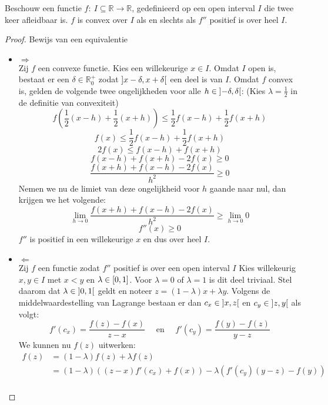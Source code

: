 \documentclass[main.tex]{subfiles}
\begin{document}
\begin{bpr}
  Beschouw een functie $f:\ I \subseteq \mathbb{R} \rightarrow \mathbb{R}$, gedefinieerd op een open interval $I$ die twee keer afleidbaar is.
  $f$ is convex over $I$ als en slechts als $f''$ positief is over heel $I$.

  \begin{proof}
    Bewijs van een equivalentie
    \begin{itemize}
    \item $\Rightarrow$\\
      Zij $f$ een convexe functie.
      Kies een willekeurige $x\in I$.
      Omdat $I$ open is, bestaat er een $\delta \in \mathbb{R}_{0}^{+}$ zodat $\interval[open]{x-\delta}{x+\delta}$ een deel is van $I$.
      Omdat $f$ convex is, gelden de volgende twee ongelijkheden voor alle $h \in \interval[open]{-\delta}{\delta}$:
      (Kies $\lambda = \frac{1}{2}$ in de definitie van convexiteit)
      \[ f\left(\frac{1}{2}(x-h) + \frac{1}{2}(x+h)\right) \le \frac{1}{2}f(x-h) + \frac{1}{2}f(x+h) \]
      \[ f(x) \le \frac{1}{2}f(x-h) + \frac{1}{2}f(x+h) \]
      \[ 2f(x) \le f(x-h) + f(x+h) \]
      \[ f(x-h) + f(x+h) -2f(x) \ge 0 \]
      \[ \frac{f(x+h)+f(x-h)-2f(x)}{h^{2}} \ge 0 \]
      Nemen we nu de limiet van deze ongelijkheid voor $h$ gaande naar nul, dan krijgen we het volgende:
      \[ \lim_{h \rightarrow 0}\frac{f(x+h)+f(x-h)-2f(x)}{h^{2}} \ge \lim_{h \rightarrow 0}0 \]
      \[ f''(x) \ge 0 \]
      $f''$ is positief in een willekeurige $x$ en dus over heel $I$.
    \item $\Leftarrow$\\
      Zij $f$ een functie zodat $f''$ positief is over een open interval $I$
      Kies willekeurig $x,y \in I$   met $x < y$ en $\lambda \in \interval{0}{1}$.
      Voor $\lambda = 0$ of $\lambda = 1$ is dit deel triviaal.
      Stel daarom dat $\lambda \in \interval[open]{0}{1}$ geldt en noteer $z = (1-\lambda)x + \lambda y$.
      Volgens de middelwaardestelling van Lagrange bestaan er dan $c_{x}\in \interval[open]{x}{z}$ en $c_{y}\in \interval[open]{z}{y}$ als volgt:
      \[ f'(c_{x}) = \frac{f(z)-f(x)}{z-x} \quad\text{ en }\quad f'(c_{y}) = \frac{f(y)-f(z)}{y-z} \]
      We kunnen nu $f(z)$ uitwerken:
      \[
      \begin{array}{rl}
        f(z) 
        &= (1-\lambda)f(z) + \lambda f(z)\\
        &= (1-\lambda)\left((z-x)f'(c_{x}) + f(x)\right) - \lambda\left( f'(c_{y})(y-z)-f(y)\right)\\

\end{array}\]
\end{itemize}
\end{proof}
\end{bpr}
\end{document}
